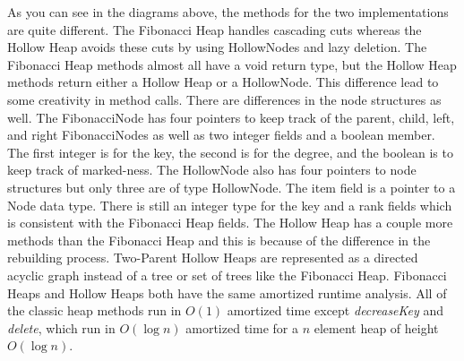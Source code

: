 \documentclass[letter,10pt]{article}
\begin{document}
\quad As you can see in the diagrams above, the methods for the two implementations are quite different. The Fibonacci Heap handles cascading cuts whereas the Hollow Heap avoids these cuts by using HollowNodes and lazy deletion. The Fibonacci Heap methods almost all have a void return type, but the Hollow Heap methods return either a Hollow Heap or a HollowNode. This difference lead to some creativity in method calls. There are differences in the node structures as well. The FibonacciNode has four pointers to keep track of the parent, child, left, and right FibonacciNodes as well as two integer fields and a boolean member. The first integer is for the key, the second is for the degree, and the boolean is to keep track of marked-ness. The HollowNode also has four pointers to node structures but only three are of type HollowNode. The item field is a pointer to a Node data type. There is still an integer type for the key and a rank fields which is consistent with the Fibonacci Heap fields. The Hollow Heap has a couple more methods than the Fibonacci Heap and this is because of the difference in the rebuilding process. Two-Parent Hollow Heaps are represented as a directed acyclic graph instead of a tree or set of trees like the Fibonacci Heap. Fibonacci Heaps and Hollow Heaps both have the same amortized runtime analysis. All of the classic heap methods run in $O(1)$ amortized time except \textit{decreaseKey} and \textit{delete}, which run in $O(\log n)$ amortized time for a $n$ element heap of height $O(\log n)$.\\
\end{document}
